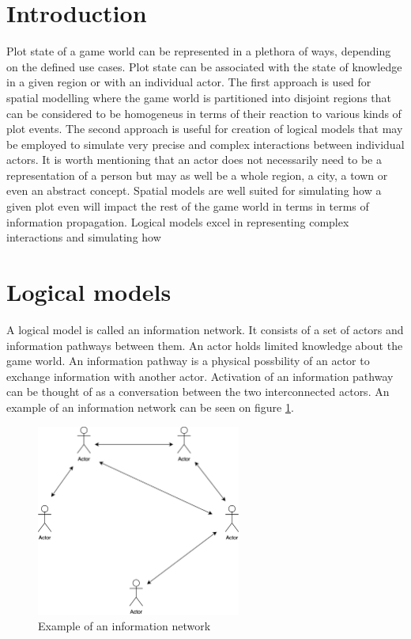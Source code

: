 
\section{Introduction}

Plot state of a game world can be represented in a plethora of ways, depending on the defined use cases.
Plot state can be associated with the state of knowledge in a given region or with an individual actor.
The first approach is used for spatial modelling where the game world is partitioned into disjoint regions that can be considered to be homogeneus in terms of their reaction to various kinds of plot events.
The second approach is useful for creation of logical models that may be employed to simulate very precise and complex interactions between individual actors.
It is worth mentioning that an actor does not necessarily need to be a representation of a person but may as well be a whole region, a city, a town or even an abstract concept.
Spatial models are well suited for simulating how a given plot even will impact the rest of the game world in terms in terms of information propagation.
Logical models excel in representing complex interactions and simulating how

\section{Logical models}

A logical model is called an information network.
It consists of a set of actors and information pathways between them.
An actor holds limited knowledge about the game world.
An information pathway is a physical possbility of an actor to exchange information with another actor.
Activation of an information pathway can be thought of as a conversation between the two interconnected actors.
An example of an information network can be seen on figure \ref{fig:logical_model_example}.

\begin{figure}
    \centering
    \includegraphics[width=0.6\textwidth]{images/logical_model_example.png}
    \caption{Example of an information network}\label{fig:logical_model_example}
\end{figure}


